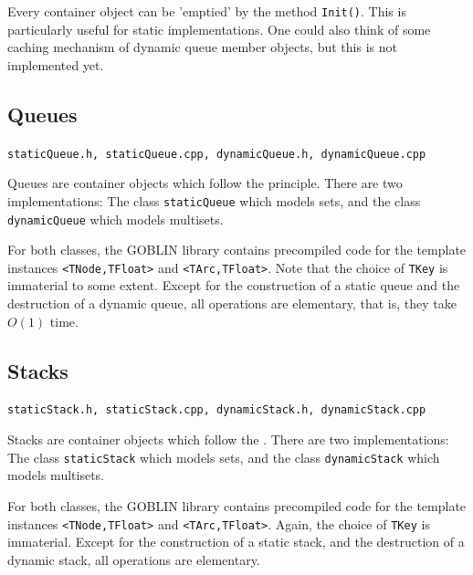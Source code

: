 \documentclass[a4paper,11pt,twoside]{book}
\begin{document}
\begin{multicols}{2}
Every container object can be 'emptied' by the method \verb/Init()/.  This is
particularly useful for static implementations. One could also think of some
caching mechanism of dynamic queue member objects, but this is not implemented
yet.


\subsection{Queues}
\myincludes\verb/staticQueue.h, staticQueue.cpp, dynamicQueue.h, dynamicQueue.cpp/

\bigskip\noindent
Queues are container objects which follow the  principle.
There are two implementations: The class \verb/staticQueue/ which models sets,
and the class \verb/dynamicQueue/ which models multisets.

For both classes, the GOBLIN library contains precompiled code for the template
instances \verb/<TNode,TFloat>/ and \verb/<TArc,TFloat>/. Note that the choice
of \verb/TKey/ is immaterial to some extent.
Except for the construction of a static queue and the destruction of a dynamic
queue, all operations are elementary, that is, they take $O(1)$ time.


\subsection{Stacks}
\myincludes\verb/staticStack.h, staticStack.cpp, dynamicStack.h, dynamicStack.cpp/

\bigskip\noindent
Stacks are container objects which follow the .
There are two implementations: The class \verb/staticStack/ which models sets,
and the class \verb/dynamicStack/ which models multisets.

For both classes, the GOBLIN library contains precompiled code for the template
instances \verb/<TNode,TFloat>/ and \verb/<TArc,TFloat>/. Again, the choice of
\verb/TKey/ is immaterial. Except for the construction of a static stack,
and the destruction of a dynamic stack, all operations are elementary.



\end{multicols}
\end{document}
